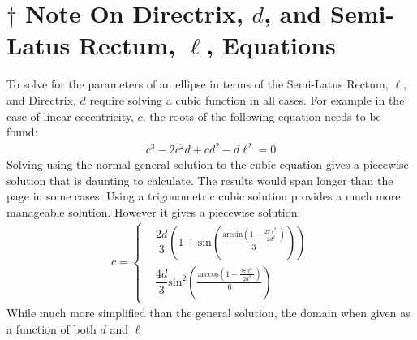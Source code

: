 \documentclass{article}
\begin{document}
\section*{$\dagger$ Note On Directrix, $d$, and Semi-Latus Rectum, $\ell$, Equations}
To solve for the parameters of an ellipse in terms of the Semi-Latus Rectum, $\ell$, and Directrix, $d$ require solving a cubic function in all cases. For example in the case of linear eccentricity, $c$, the roots of the following equation needs to be found:
\begin{align*} %
c^3-2c^2 d+c d^2-d \ell^2 = 0 
\end{align*}
Solving using the normal general solution to the cubic equation gives a piecewise solution that is daunting to calculate. The results would span longer than the page in some cases.
Using a trigonometric cubic solution provides a much more manageable solution. However it gives a piecewise solution:
\begin{align*} 
c =\begin{cases}
 &  \dfrac{2d}{3}  \left (1 + \text{sin} \left (\frac{\text{arcsin}\left (1 - \frac{27 \ell^2}{2 d^2}\right )}{3} \right ) \right )\\ 
 & \dfrac{4d}{3}  \text{sin}^2 \left (\frac{\text{arccos}\left (1 - \frac{27 \ell^2}{2 d^2}\right )}{6} \right )
\end{cases}   
\end{align*}
While much more simplified than the general solution, the domain when given as a function of both $d$ and $\ell$ 
\newpage

\section*{}
\begin{center}
\noindent{}
\newpage

\section*{}
\noindent{}
\newpage

\section*{}
\noindent{}
\newpage

\section*{}
\noindent{}
\end{center}
\newpage
\end{document}

